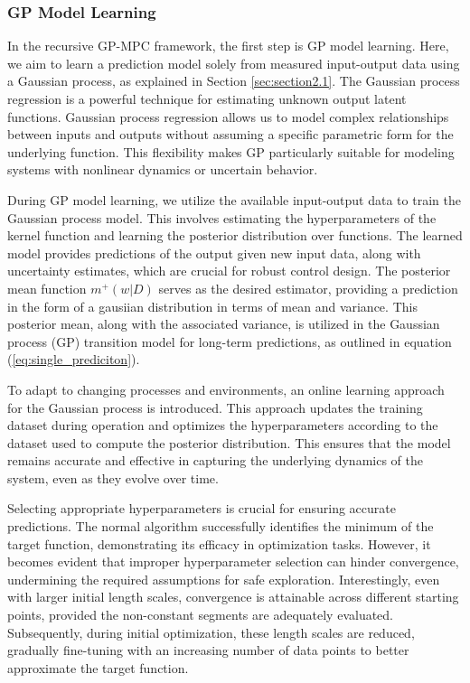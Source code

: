 \subsubsection{GP Model Learning}
In the recursive GP-MPC framework, the first step is GP model learning. Here, we aim to learn a prediction model solely from measured input-output data using a Gaussian process, as explained in Section \ref{sec:section2.1}. The Gaussian process regression is a powerful technique for estimating unknown output latent functions. Gaussian process regression allows us to model complex relationships between inputs and outputs without assuming a specific parametric form for the underlying function. This flexibility makes GP particularly suitable for modeling systems with nonlinear dynamics or uncertain behavior. 

During GP model learning, we utilize the available input-output data to train the Gaussian process model. This involves estimating the hyperparameters of the kernel function and learning the posterior distribution over functions. The learned model provides predictions of the output given new input data, along with uncertainty estimates, which are crucial for robust control design. The posterior mean function $m^+(w|D)$ serves as the desired estimator, providing a prediction in the form of a gausiian distribution in terms of mean and variance. This posterior mean, along with the associated variance, is utilized in the Gaussian process (GP) transition model for long-term predictions, as outlined in equation (\ref{eq:single_prediciton}).

To adapt to changing processes and environments, an online learning approach for the Gaussian process is introduced. This approach updates the training dataset during operation and optimizes the hyperparameters according to the dataset used to compute the posterior distribution. This ensures that the model remains accurate and effective in capturing the underlying dynamics of the system, even as they evolve over time.


Selecting appropriate hyperparameters is crucial for ensuring accurate predictions. The normal algorithm successfully identifies the minimum of the target function, demonstrating its efficacy in optimization tasks. However, it becomes evident that improper hyperparameter selection can hinder convergence, undermining the required assumptions for safe exploration. Interestingly, even with larger initial length scales, convergence is attainable across different starting points, provided the non-constant segments are adequately evaluated. Subsequently, during initial optimization, these length scales are reduced, gradually fine-tuning with an increasing number of data points to better approximate the target function.


